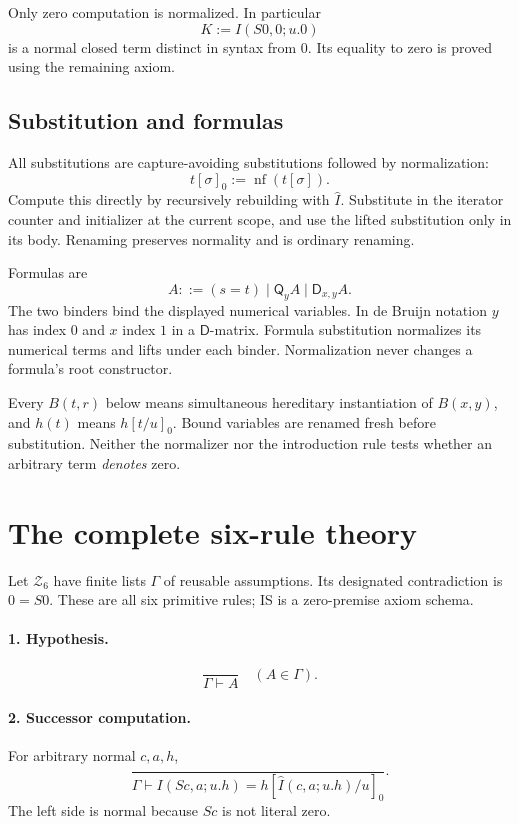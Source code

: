 \documentclass[11pt]{article}
\newcommand{\Zsix}{\mathcal Z_6}
\newcommand{\Q}{\mathsf Q}\newcommand{\D}{\mathsf D}
\newcommand{\nf}{\operatorname{nf}}\newcommand{\It}{\widehat I}
\begin{document}
Only zero computation is normalized. In particular
\[
                   K:=I(S0,0;u.0)                       \tag{K}\label{eq:alias}
\]
is a normal closed term distinct in syntax from \(0\). Its equality
to zero is proved using the remaining axiom.

\subsection{Substitution and formulas}
All substitutions are capture-avoiding substitutions followed by
normalization:
\[
                    t[\sigma]_0:=\nf(t[\sigma]).
                                                        \tag{HS}\label{eq:hsub}
\]
Compute this directly by recursively rebuilding with \(\It\).
Substitute in the iterator counter and initializer at the current scope,
and use the lifted substitution only in its body.
Renaming preserves normality and is ordinary renaming.

Formulas are
\[
                 A::=(s=t)\mid\Q_y A\mid\D_{x,y}A .
\]
The two binders bind the displayed numerical variables. In de Bruijn
notation \(y\) has index \(0\) and \(x\) index \(1\) in a \(\D\)-matrix.
Formula substitution normalizes its numerical terms and lifts under
each binder. Normalization never changes a formula's root constructor.

Every \(B(t,r)\) below means simultaneous hereditary instantiation
of \(B(x,y)\), and \(h(t)\) means \(h[t/u]_0\). Bound variables are
renamed fresh before substitution. Neither the normalizer nor the
introduction rule tests whether an arbitrary term \emph{denotes} zero.

\section{The complete six-rule theory}\label{sec:rules}
Let \(\Zsix\) have finite lists \(\Gamma\) of reusable assumptions.
Its designated contradiction is \(0=S0\). These are all six primitive
rules; IS is a zero-premise axiom schema.

\paragraph{1. Hypothesis.}
\[
             \frac{\ }{\Gamma\vdash A}\quad(A\in\Gamma).
                                                        \tag{Hyp}
\]
\paragraph{2. Successor computation.}
For arbitrary normal \(c,a,h\),
\[
 \frac{\ }{\Gamma\vdash
 I(Sc,a;u.h)=h[\It(c,a;u.h)/u]_0}.
                                                        \tag{IS}\label{eq:is}
\]
The left side is normal because \(Sc\) is not literal zero.
\end{document}
